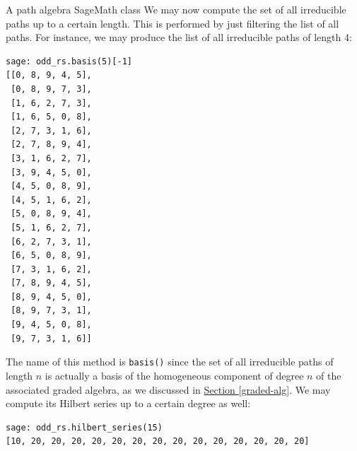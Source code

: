 \begin{chapter}{A path algebra SageMath class}
We may now compute the set of all irreducible paths up to a certain length. This is performed by just filtering the list of all paths. For instance, we may produce the list of all irreducible paths of length 4:
\begin{lstlisting}
sage: odd_rs.basis(5)[-1]
[[0, 8, 9, 4, 5],
 [0, 8, 9, 7, 3],
 [1, 6, 2, 7, 3],
 [1, 6, 5, 0, 8],
 [2, 7, 3, 1, 6],
 [2, 7, 8, 9, 4],
 [3, 1, 6, 2, 7],
 [3, 9, 4, 5, 0],
 [4, 5, 0, 8, 9],
 [4, 5, 1, 6, 2],
 [5, 0, 8, 9, 4],
 [5, 1, 6, 2, 7],
 [6, 2, 7, 3, 1],
 [6, 5, 0, 8, 9],
 [7, 3, 1, 6, 2],
 [7, 8, 9, 4, 5],
 [8, 9, 4, 5, 0],
 [8, 9, 7, 3, 1],
 [9, 4, 5, 0, 8],
 [9, 7, 3, 1, 6]]
\end{lstlisting}
The name of this method is \texttt{basis()} since the set of all irreducible paths of length $n$ is actually a basis of the homogeneous component of degree $n$ of the associated graded algebra, as we discussed in \hyperref[graded-alg]{Section \ref*{graded-alg}}. We may compute its Hilbert series up to a certain degree as well:
\begin{lstlisting}
sage: odd_rs.hilbert_series(15)
[10, 20, 20, 20, 20, 20, 20, 20, 20, 20, 20, 20, 20, 20, 20]
\end{lstlisting}
\end{chapter}